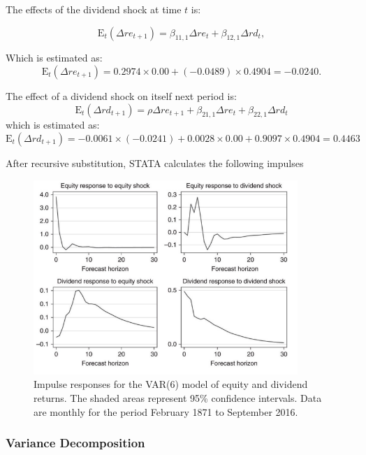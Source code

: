 \documentclass[11pt]{article}
\begin{document}
The effects of the dividend shock at time $t$ is:

\begin{equation}
\mathrm{E}_t\left(\Delta r e_{t+1}\right)=\beta_{11,1} \Delta r e_t+\beta_{12,1} \Delta r d_t,
\end{equation}

Which is estimated as:
\begin{equation}
\mathrm{E}_t\left(\Delta r e_{t+1}\right)=0.2974 \times 0.00+(-0.0489) \times 0.4904=-0.0240 .
\end{equation}

The effect of a dividend shock on itself next period is:
\begin{equation}
\mathrm{E}_t\left(\Delta r d_{t+1}\right)=\rho \Delta r e_{t+1}+\beta_{21,1} \Delta r e_t+\beta_{22,1} \Delta r d_t
\end{equation}
which is estimated as:
\begin{equation}
\mathrm{E}_t\left(\Delta r d_{t+1}\right)=-0.0061 \times(-0.0241)+0.0028 \times 0.00+0.9097 \times 0.4904=0.4463
\end{equation}

After recursive substitution, STATA calculates the following impulses

\begin{figure}[h]
    \centering
    \includegraphics[width=10cm]{pics/impulse response figures.png}
    \caption{Impulse responses for the VAR(6) model of equity and dividend returns. The shaded areas represent 95\% confidence intervals. Data are monthly for the period February 1871 to
September 2016.}
    \label{fig:impulse response analysis figures}
\end{figure}

\subsubsection{Variance Decomposition}
\end{document}
